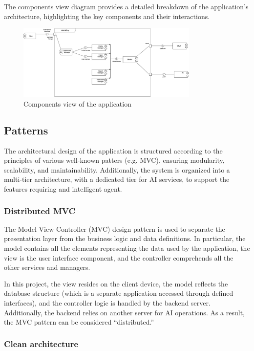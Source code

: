 \documentclass{article}
\begin{document}
The components view diagram provides a detailed breakdown of the application's architecture, highlighting the key components and their interactions.
\begin{figure}[H]
    \centering
    \includegraphics[width=0.8\textwidth]{images/ComponentView.png}
    \caption{Components view of the application}
    \label{fig:components_diagram}
\end{figure}

\subsection{Patterns}

The architectural design of the application is structured according to the principles of various well-known patters (e.g. MVC), ensuring modularity, scalability, and maintainability.
Additionally, the system is organized into a multi-tier architecture, with a dedicated tier for AI services, to support the features requiring and intelligent agent.

\subsubsection{Distributed MVC}

The Model-View-Controller (MVC) design pattern is used to separate the presentation layer from the business logic and data definitions.
In particular, the model contains all the elements representing the data used by the application, the view is the user interface component, and the controller comprehends all the other services and managers.

In this project, the view resides on the client device, the model reflects the database structure (which is a separate application accessed through defined interfaces), and the controller logic is handled by the backend server.
Additionally, the backend relies on another server for AI operations.
As a result, the MVC pattern can be considered “distributed.”

\subsubsection{Clean architecture}
\end{document}
